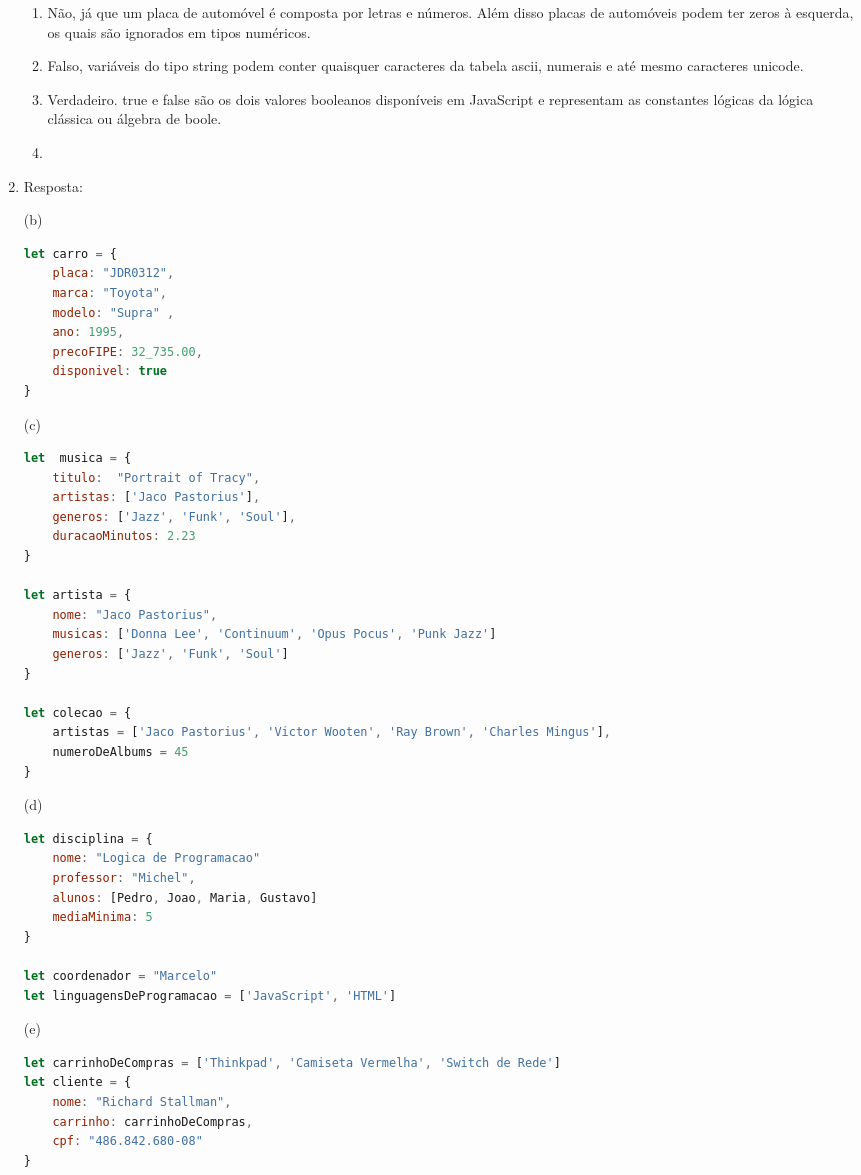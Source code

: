\documentclass[11pt]{article}
\begin{document}
\begin{enumerate}
	\begin{enumerate}[label=(\alph*)]
  		\item Não, já que um placa de automóvel é composta por letras e números. Além disso placas de automóveis podem ter zeros à esquerda, os quais são ignorados em tipos numéricos.
  		\item Falso, variáveis do tipo string podem conter quaisquer caracteres da tabela ascii, numerais e até mesmo caracteres unicode.
  		\item Verdadeiro. true e false são os dois valores booleanos disponíveis em JavaScript e representam as constantes lógicas da lógica clássica ou álgebra de boole. 
  		\item 
	\end{enumerate}

\item Resposta: 

(b)
\begin{lstlisting}[language=JavaScript]
let carro = {
	placa: "JDR0312",
	marca: "Toyota",
	modelo: "Supra" ,
	ano: 1995,
	precoFIPE: 32_735.00,
	disponivel: true
}
\end{lstlisting}

(c)
\begin{lstlisting}[language=JavaScript]
let  musica = {
	titulo:  "Portrait of Tracy",
	artistas: ['Jaco Pastorius'],
	generos: ['Jazz', 'Funk', 'Soul'],
	duracaoMinutos: 2.23
}

let artista = {
	nome: "Jaco Pastorius",
	musicas: ['Donna Lee', 'Continuum', 'Opus Pocus', 'Punk Jazz']
	generos: ['Jazz', 'Funk', 'Soul']
}

let colecao = {
	artistas = ['Jaco Pastorius', 'Victor Wooten', 'Ray Brown', 'Charles Mingus'],
	numeroDeAlbums = 45
}
\end{lstlisting}


(d)
\begin{lstlisting}[language=JavaScript]
let disciplina = {
	nome: "Logica de Programacao"
	professor: "Michel",
	alunos: [Pedro, Joao, Maria, Gustavo]
	mediaMinima: 5
} 

let coordenador = "Marcelo"
let linguagensDeProgramacao = ['JavaScript', 'HTML']
\end{lstlisting}

\newpage

(e)
\begin{lstlisting}[language=JavaScript]
let carrinhoDeCompras = ['Thinkpad', 'Camiseta Vermelha', 'Switch de Rede']
let cliente = {
	nome: "Richard Stallman",
	carrinho: carrinhoDeCompras, 
	cpf: "486.842.680-08"
}
\end{lstlisting}



\end{enumerate}
\end{document}
